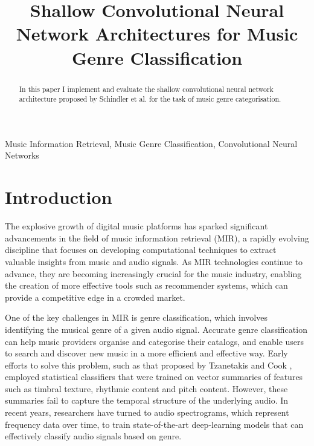 \documentclass[conference]{IEEEtran}
\begin{document}

\title{Shallow Convolutional Neural Network Architectures for Music Genre Classification}

\author{
}

\maketitle

\begin{abstract}
In this paper I implement and evaluate the shallow convolutional neural network architecture proposed by Schindler et al. \cite{SchindlerLidyRauber} for the task of music genre categorisation.
\end{abstract}

\begin{IEEEkeywords}
Music Information Retrieval, Music Genre Classification, Convolutional Neural Networks
\end{IEEEkeywords}

\section{Introduction}

The explosive growth of digital music platforms has sparked significant advancements in the field of music information retrieval (MIR), a rapidly evolving discipline that focuses on developing computational techniques to extract valuable insights from music and audio signals.
As MIR technologies continue to advance, they are becoming increasingly crucial for the music industry, enabling the creation of more effective tools such as recommender systems, which can provide a competitive edge in a crowded market.

One of the key challenges in MIR is genre classification, which involves identifying the musical genre of a given audio signal.
Accurate genre classification can help music providers organise and categorise their catalogs, and enable users to search and discover new music in a more efficient and effective way.
Early efforts to solve this problem, such as that proposed by Tzanetakis and Cook \cite{TzanetakisCook}, employed statistical classifiers that were trained on vector summaries of features such as timbral texture, rhythmic content and pitch content.
However, these summaries fail to capture the temporal structure of the underlying audio.
In recent years, researchers have turned to audio spectrograms, which represent frequency data over time, to train state-of-the-art deep-learning models that can effectively classify audio signals based on genre.
\end{document}
